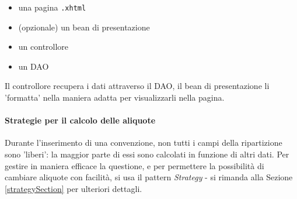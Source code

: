 \begin{itemize}
\item una pagina \texttt{.xhtml}
\item (opzionale) un bean di presentazione
\item un controllore
\item un DAO\newline

\end{itemize}
Il controllore recupera i dati attraverso il DAO, il bean di presentazione li 'formatta' nella maniera adatta per visualizzarli nella pagina.

\paragraph{Strategie per il calcolo delle aliquote}
Durante l'inserimento di una convenzione, non tutti i campi della ripartizione sono 'liberi': la maggior parte di essi sono calcolati in funzione di altri dati. Per gestire in maniera efficace la questione, e per permettere la possibilità di cambiare aliquote con facilità, si usa il pattern \textsl{Strategy} - si rimanda alla Sezione \ref{strategySection} per ulteriori dettagli. 
